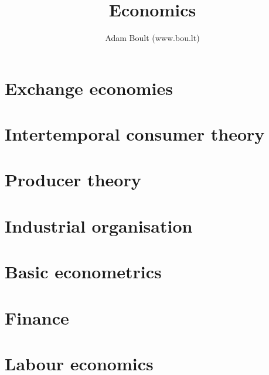 \documentclass[oneside]{book}
\begin{document}
\author{Adam Boult (www.bou.lt)}
\title{Economics}
\maketitle

\setcounter{tocdepth}{1}
\tableofcontents



\part{Exchange economies}









\part{Intertemporal consumer theory}




\part{Producer theory}





\part{Industrial organisation}





\part{Basic econometrics}






\part{Finance}








\part{Labour economics}


\end{document}
